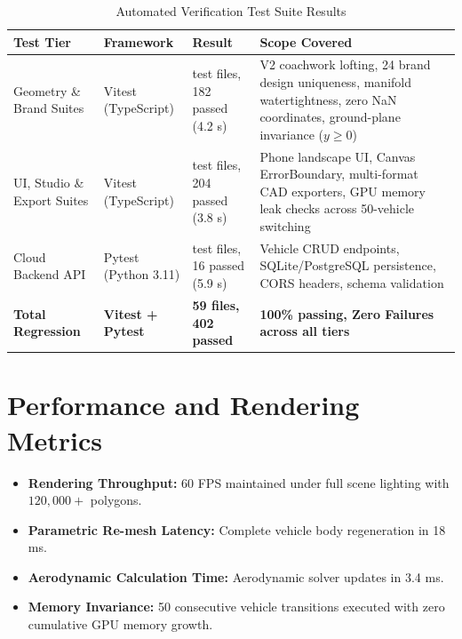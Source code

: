 \documentclass[12pt,a4paper]{report}
\begin{document}
\begin{table}[H]
\centering
\small
\caption{Automated Verification Test Suite Results}
\label{tab:test_results}
\renewcommand{\arraystretch}{1.3}
\begin{tabularx}{\textwidth}{|>{\raggedright\arraybackslash}p{2.6cm}|>{\raggedright\arraybackslash}p{2.2cm}|>{\raggedright\arraybackslash}p{2.8cm}|>{\raggedright\arraybackslash}X|}
\hline
\textbf{Test Tier} & \textbf{Framework} & \textbf{Result} & \textbf{Scope Covered} \\
\hline
Geometry \& Brand Suites & Vitest (TypeScript) & 23 test files, 182 passed (4.2 s) & V2 coachwork lofting, 24 brand design uniqueness, manifold watertightness, zero NaN coordinates, ground-plane invariance ($y \ge 0$) \\
\hline
UI, Studio \& Export Suites & Vitest (TypeScript) & 33 test files, 204 passed (3.8 s) & Phone landscape UI, Canvas ErrorBoundary, multi-format CAD exporters, GPU memory leak checks across 50-vehicle switching \\
\hline
Cloud Backend API & Pytest (Python 3.11) & 3 test files, 16 passed (5.9 s) & Vehicle CRUD endpoints, SQLite/PostgreSQL persistence, CORS headers, schema validation \\
\hline
\textbf{Total Regression} & \textbf{Vitest + Pytest} & \textbf{59 files, 402 passed} & \textbf{100\% passing, Zero Failures across all tiers} \\
\hline
\end{tabularx}
\end{table}

\section{Performance and Rendering Metrics}
\begin{itemize}
    \item \textbf{Rendering Throughput:} 60 FPS maintained under full scene lighting with $120{,}000+$ polygons.
    \item \textbf{Parametric Re-mesh Latency:} Complete vehicle body regeneration in 18 ms.
    \item \textbf{Aerodynamic Calculation Time:} Aerodynamic solver updates in 3.4 ms.
    \item \textbf{Memory Invariance:} 50 consecutive vehicle transitions executed with zero cumulative GPU memory growth.
\end{itemize}
\end{document}
